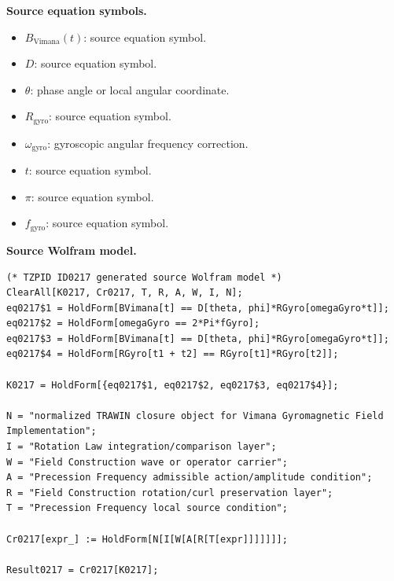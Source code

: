 \begin{minipage}[t]{0.49\linewidth}
\begingroup
\small
\raggedright
\textbf{Source equation symbols.}\par
\begin{itemize}[leftmargin=1.35em,itemsep=1pt,topsep=1pt,parsep=0pt]
    \item $B_{\mathrm{Vimana}}(t)$: source equation symbol.
    \item $D$: source equation symbol.
    \item $\theta$: phase angle or local angular coordinate.
    \item $R_{\mathrm{gyro}}$: source equation symbol.
    \item $\omega_{\mathrm{gyro}}$: gyroscopic angular frequency correction.
    \item $t$: source equation symbol.
    \item $\pi$: source equation symbol.
    \item $f_{\mathrm{gyro}}$: source equation symbol.
\end{itemize}
\endgroup
\end{minipage}\hfill
\begin{minipage}[t]{0.47\linewidth}
\begingroup
\scriptsize
\raggedright
\textbf{Source Wolfram model.}\par
\begin{Verbatim}[fontsize=\tiny,breaklines=true,breakanywhere=true]
(* TZPID ID0217 generated source Wolfram model *)
ClearAll[K0217, Cr0217, T, R, A, W, I, N];
eq0217$1 = HoldForm[BVimana[t] == D[theta, phi]*RGyro[omegaGyro*t]];
eq0217$2 = HoldForm[omegaGyro == 2*Pi*fGyro];
eq0217$3 = HoldForm[BVimana[t] == D[theta, phi]*RGyro[omegaGyro*t]];
eq0217$4 = HoldForm[RGyro[t1 + t2] == RGyro[t1]*RGyro[t2]];

K0217 = HoldForm[{eq0217$1, eq0217$2, eq0217$3, eq0217$4}];

N = "normalized TRAWIN closure object for Vimana Gyromagnetic Field Implementation";
I = "Rotation Law integration/comparison layer";
W = "Field Construction wave or operator carrier";
A = "Precession Frequency admissible action/amplitude condition";
R = "Field Construction rotation/curl preservation layer";
T = "Precession Frequency local source condition";

Cr0217[expr_] := HoldForm[N[I[W[A[R[T[expr]]]]]]];

Result0217 = Cr0217[K0217];
\end{Verbatim}
\endgroup
\end{minipage}

